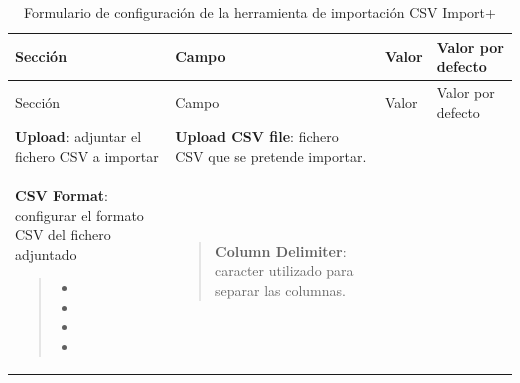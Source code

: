 \documentclass[
]{article}
\providecommand{\tightlist}{%
  \setlength{\itemsep}{0pt}\setlength{\parskip}{0pt}}
\begin{document}
\begin{longtable}[]{@{}llll@{}}
\caption{Formulario de configuración de la herramienta de importación
CSV Import+}\tabularnewline
\toprule
Sección & Campo & Valor & Valor por defecto\tabularnewline
\midrule
\endfirsthead
\toprule
Sección & Campo & Valor & Valor por defecto\tabularnewline
\midrule
\endhead
\textbf{Upload}: adjuntar el fichero CSV a importar & \textbf{Upload CSV
file}: fichero CSV que se pretende importar. & &\tabularnewline
\begin{minipage}[t]{0.22\columnwidth}\raggedright
\textbf{CSV Format}: configurar el formato CSV del fichero adjuntado

\begin{quote}
\begin{itemize}
\tightlist
\item
\item
\item
\item
\end{itemize}
\end{quote}\strut
\end{minipage} & \begin{minipage}[t]{0.22\columnwidth}\raggedright
\begin{quote}
\textbf{Column Delimiter}: caracter utilizado para separar las columnas.
\end{quote}


\end{minipage}
\end{longtable}
\end{document}

